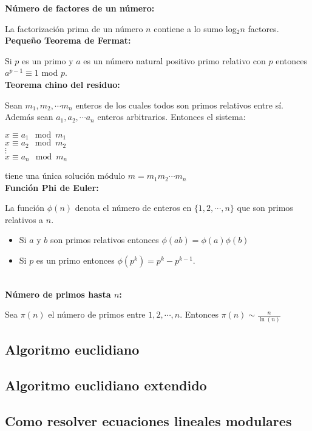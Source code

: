 \begin{multicols}{2}

\textbf{N\'umero de factores de un n\'umero:}

La factorizaci\'on prima de un n\'umero $n$ contiene a lo sumo log$_2n$ factores.\\
\textbf{Peque\~no Teorema de Fermat:}

Si $p$ es un primo y $a$ es un n\'umero natural positivo primo relativo con $p$ entonces $a^{p-1} \equiv 1$ mod $p$.\\
\textbf{Teorema chino del residuo:}

Sean $m_1,m_2,\cdots m_n$ enteros de los cuales todos son primos relativos entre s\'i. Adem\'as sean $a_1,a_2, \cdots a_n$ enteros arbitrarios. Entonces el sistema:
\begin{center}
$x\equiv a_1\mod m_1$\\
$x\equiv a_2\mod m_2$\\
$ \vdots$\\
$x\equiv a_n\mod m_n$
\end{center}
tiene una \'unica soluci\'on m\'odulo $m=m_1m_2\cdots m_n$\\
\textbf{Funci\'on Phi de Euler:}

La funci\'on $\phi (n)$ denota el n\'umero de enteros en $\{1,2,\cdots ,n\}$ que son primos relativos a $n$. 
\begin{itemize}
\item Si $a$ y $b$  son primos relativos entonces $\phi(ab)=\phi(a)\phi(b)$
\item Si $p$ es un primo entonces $\phi(p^k)=p^k-p^{k-1}$.
\end{itemize} \\

\textbf{N\'umero de primos hasta $n$:}

Sea $\pi(n)$ el n\'umero de primos entre $1,2,\cdots ,n$. Entonces $\pi(n)\sim \frac{n}{\ln(n)}$

\end{multicols}
\subsection{Algoritmo euclidiano}
\pagebreak
\subsection{Algoritmo euclidiano extendido}
\subsection{Como resolver ecuaciones lineales modulares}
